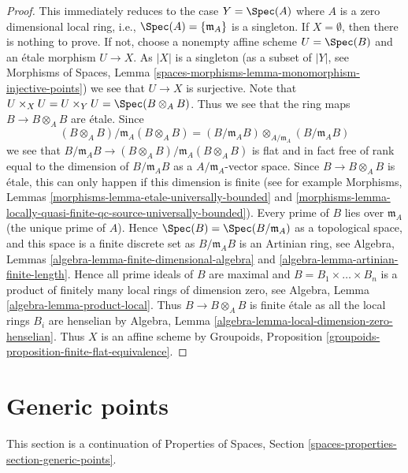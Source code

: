 \begin{proof}
This immediately reduces to the case $Y = \Spec(A)$ where
$A$ is a zero dimensional local ring, i.e.,
$\Spec(A) = \{\mathfrak m_A\}$
is a singleton. If $X = \emptyset$, then there is nothing to prove.
If not, choose a nonempty affine scheme $U = \Spec(B)$
and an \'etale morphism $U \to X$. As $|X|$ is a singleton (as a
subset of $|Y|$, see
Morphisms of Spaces, Lemma
\ref{spaces-morphisms-lemma-monomorphism-injective-points})
we see that $U \to X$ is surjective. Note that
$U \times_X U = U \times_Y U = \Spec(B \otimes_A B)$.
Thus we see that the ring maps $B \to B \otimes_A B$ are \'etale.
Since
$$
(B \otimes_A B)/\mathfrak m_A(B \otimes_A B)
=
(B/\mathfrak m_AB) \otimes_{A/\mathfrak m_A} (B/\mathfrak m_AB)
$$
we see that
$B/\mathfrak m_AB \to (B \otimes_A B)/\mathfrak m_A(B \otimes_A B)$
is flat and in fact free of rank equal to the dimension of
$B/\mathfrak m_AB$ as a $A/\mathfrak m_A$-vector space. Since
$B \to B \otimes_A B$ is \'etale, this can only happen if this
dimension is finite (see for example
Morphisms, Lemmas \ref{morphisms-lemma-etale-universally-bounded} and
\ref{morphisms-lemma-locally-quasi-finite-qc-source-universally-bounded}).
Every prime of $B$ lies over $\mathfrak m_A$ (the unique prime of $A$).
Hence $\Spec(B) = \Spec(B/\mathfrak m_A)$ as a topological
space, and this space is a finite discrete set as $B/\mathfrak m_A B$
is an Artinian ring, see
Algebra, Lemmas \ref{algebra-lemma-finite-dimensional-algebra} and
\ref{algebra-lemma-artinian-finite-length}.
Hence all prime ideals of $B$ are maximal and
$B = B_1 \times \ldots \times B_n$ is a product of finitely many
local rings of dimension zero, see
Algebra, Lemma \ref{algebra-lemma-product-local}.
Thus $B \to B \otimes_A B$ is finite \'etale as all the local rings
$B_i$ are henselian by
Algebra, Lemma \ref{algebra-lemma-local-dimension-zero-henselian}.
Thus $X$ is an affine scheme by
Groupoids, Proposition \ref{groupoids-proposition-finite-flat-equivalence}.
\end{proof}








\section{Generic points}
\label{section-generic-points}

\noindent
This section is a continuation of
Properties of Spaces, Section \ref{spaces-properties-section-generic-points}.

